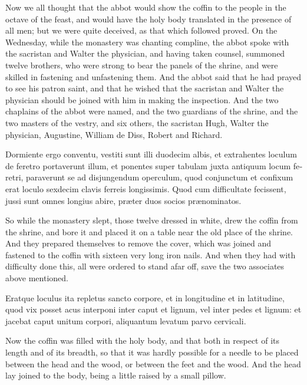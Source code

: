 \documentclass{book}
\begin{document}
\begin{paracol}{2}
Now we all thought that the abbot would show the coffin to the people in the octave of the feast, and would have the holy body translated in the presence of all men; but we were quite deceived, as that which followed proved. On the Wednesday, while the monastery was chanting compline, the abbot spoke with the sacristan and Walter the physician, and having taken counsel, summoned twelve brothers, who were strong to bear the panels of the shrine, and were skilled in fastening and unfastening them. And the abbot said that he had prayed to see his patron saint, and that he wished that the sacristan and Walter the physician should be joined with him in making the inspection. And the two chaplains of the abbot were named, and the two guardians of the shrine, and the two masters of the vestry, and six others, the sacristan Hugh, Walter the physician, Augustine, William de Diss, Robert and Richard.

\switchcolumn*

\begin{otherlanguage}{latin}
Dormiente ergo conventu, vestiti sunt illi duodecim albis, et extrahentes loculum de feretro portaverunt illum, et ponentes super tabulam juxta antiquum locum feretri, paraverunt se ad disjungendum operculum, quod conjunctum et confixum erat loculo sexdecim clavis ferreis longissimis. Quod cum difficultate fecissent, jussi sunt omnes longius abire, pr\ae{}ter duos socios pr\ae{}nominatos.
\end{otherlanguage}

\switchcolumn

So while the monastery slept, those twelve dressed in white, drew the coffin from the shrine, and bore it and placed it on a table near the old place of the shrine. And they prepared themselves to remove the cover, which was joined and fastened to the coffin with sixteen very long iron nails. And when they had with difficulty done this, all were ordered to stand afar off, save the two associates above mentioned.

\switchcolumn*

\begin{otherlanguage}{latin}
Eratque loculus ita repletus sancto corpore, et in longitudine et in latitudine, quod vix posset acus interponi inter caput et lignum, vel inter pedes et lignum: et jacebat caput unitum corpori, aliquantum levatum parvo cervicali.
\end{otherlanguage}

\switchcolumn

Now the coffin was filled with the holy body, and that both in respect of its length and of its breadth, so that it was hardly possible for a needle to be placed between the head and the wood, or between the feet and the wood. And the head lay joined to the body, being a little raised by a small pillow.


\end{paracol}
\end{document}
